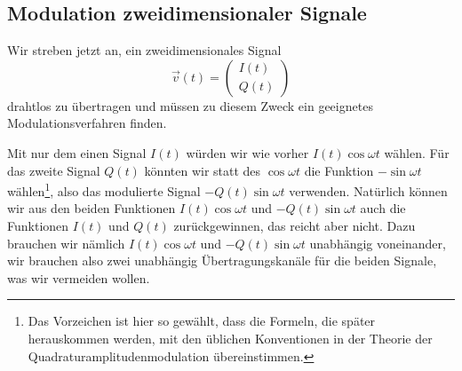 %
%
%
\subsection{Modulation zweidimensionaler Signale
\label{subsection:modulation}}
Wir streben jetzt an, ein zweidimensionales Signal
\[
\vec{v}(t)
=
\begin{pmatrix}I(t)\\Q(t)\end{pmatrix}
\]
drahtlos zu übertragen und müssen zu diesem Zweck ein geeignetes
Modulationsverfahren finden.

Mit nur dem einen Signal $I(t)$ würden wir wie vorher $I(t)\cos\omega t$
wählen.
Für das zweite Signal $Q(t)$ könnten wir statt des $\cos\omega t$ die
Funktion $-\sin\omega t$ wählen\footnote{Das Vorzeichen ist hier so 
gewählt, dass die Formeln, die später herauskommen werden, mit den
üblichen Konventionen in der Theorie der Quadraturamplitudenmodulation
übereinstimmen.}, also das modulierte Signal
$-Q(t)\sin\omega t$ verwenden.
Natürlich können wir aus den beiden Funktionen $I(t)\cos\omega t$ und
$-Q(t)\sin\omega t$ auch die Funktionen $I(t)$ und $Q(t)$ zurückgewinnen,
das reicht aber nicht.
Dazu brauchen wir nämlich $I(t)\cos\omega t$ und $-Q(t)\sin\omega t$
unabhängig voneinander, wir brauchen also zwei unabhängig Übertragungskanäle
für die beiden Signale, was wir vermeiden wollen.

